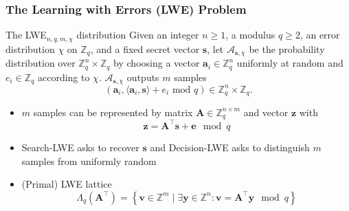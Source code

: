 \documentclass[t, aspectratio=169]{beamer}
\begin{document}
\begin{frame}
    \frametitle{The Learning with Errors (LWE) Problem}
    \begin{block}{The LWE$_{n, q, m, \chi}$ distribution}
        Given an integer $n \geq 1$, a modulus $q \geq 2$, an error distribution $\chi$ on $\mathbb{Z}_q$, and a fixed secret vector $\mathbf{s}$, let $\mathcal{A}_{\mathbf{s}, \chi}$ be the probability distribution over $\mathbb{Z}_q^n \times \mathbb{Z}_q$ by choosing a vector $\mathbf{a}_i \in \mathbb{Z}_q^n$ uniformly at random and $e_i \in \mathbb{Z}_q$ according to $\chi$. \pause
        $\mathcal{A}_{\mathbf{s}, \chi}$ outputs $m$ samples
        \begin{equation*}
            (\mathbf{a}_i, \langle \mathbf{a}_i, \mathbf{s} \rangle + e_i \text{ mod } q) \in \mathbb{Z}_q^n \times \mathbb{Z}_q.
        \end{equation*}
    \end{block}\pause
    \begin{itemize}[<+->]
        \item $m$ samples can be represented by matrix $\mathbf{A} \in \mathbb{Z}_q^{n\times m}$ and vector $\mathbf{z}$ with
              \begin{equation*}
                  \mathbf{z} =  \mathbf{A}^\intercal \mathbf{s} + \mathbf{e} \mod q
              \end{equation*}
        \item Search-LWE asks to recover $\mathbf{s}$ and Decision-LWE asks to distinguish $m$ samples from uniformly random %
        \item (Primal) LWE lattice
              \begin{equation*}
                  \Lambda_q(\mathbf{A}^\intercal) = \left\{ \mathbf{v} \in \mathbb{Z}^m \mid \exists \mathbf{y} \in \mathbb{Z}^n : \mathbf{v} = \mathbf{A}^\intercal \mathbf{y} \mod q \right\}
              \end{equation*} %
    \end{itemize}%
\end{frame}
\end{document}
